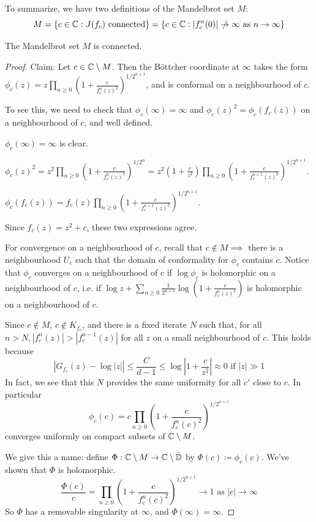 \documentclass[10pt,a4paper]{article}
\begin{document}
To summarize, we have two definitions of the Mandelbrot set $M$:
\[M = \{c \in \C : J(f_c) \text{ connected}\} = \{c \in \C: |f_c^n(0)|\centernot\to \infty \text{ as }n\to\infty\}\]
\begin{theorem}
  The Mandelbrot set $M$ is connected.
\end{theorem}
\begin{proof}
  Claim: Let $c \in \mathbb{C}\setminus M$. Then the B\"ottcher coordinate at $\infty$ takes the form $\phi_c(z) = z\prod_{n\geq 0}\left(1+\frac{c}{f_c^n(z)^2}\right)^{1/2^{n+1}}$, and is conformal on a neighbourhood of $c$.

  To see this, we need to check that $\phi_c(\infty) = \infty$ and $\phi_c(z)^2 = \phi_c(f_c(z))$ on a neighbourhood of $c$, and well defined.

  $\phi_c(\infty) = \infty$ is clear.

  $\phi_c(z)^2 = z^2\prod_{n\geq 0}\left(1+\frac{c}{f_c^n(z)^2}\right)^{1/2^n} = z^2\left(1+\frac{c}{z^2}\right)\prod_{n\geq 0}\left(1+\frac{c}{f_c^{n+1}(z)^2}\right)^{1/2^{n+1}}$.

  $\phi_c(f_c(z)) = f_c(z)\prod_{n\geq 0}\left(1+\frac{c}{f_c^{n+1}(z)^2}\right)^{1/2^{n+1}}$.

  Since $f_c(z) = z^2+c$, these two expressions agree.

  For convergence on a neighbourhood of $c$, recall that $c \notin M \implies$ there is a neighbourhood $U_c$ such that the domain of conformality for $\phi_c$ contains $c$. Notice that $\phi_c$ converges on a neighbourhood of $c$ if $\log \phi_c$ is holomorphic on a neighbourhood of $c$, i.e. if $\log z +\sum_{n\geq 0}\frac{1}{2^{n+1}}\log\left(1+\frac{c}{f_c^n(z)^2}\right)$ is holomorphic on a neighbourhood of $c$.

  Since $c \notin M$, $c \notin K_{f_c}$, and there is a fixed iterate $N$ such that, for all $n > N, |f_c^n(z)| > |f_c^{n-1}(z)|$ for all $z$ on a small neighbourhood of $c$. This holds because
  \[\left|G_{f_c}(z) - \log|z|\right| \leq \frac{C}{d-1} \leq \log\left|1+\frac{c}{z^2}\right| \approx 0 \text{ if } |z| \gg 1\]
  In fact, we see that this $N$ provides the same uniformity for all $c'$ close to $c$. In particular
  \[\phi_c(c) = c\prod_{n\geq 0}\left(1+\frac{c}{f_c^n(c)^2}\right)^{1/2^{n+1}}\]
  converges uniformly on compact subsets of $\mathbb{C}\setminus M$.

  We give this a name: define $\Phi:\mathbb{C}\setminus M \to \mathbb{C}\setminus\bar{\mathbb{D}}$ by $\Phi(c) \coloneqq \phi_c(c)$. We've shown that $\Phi$ is holomorphic.
  \[\frac{\Phi(c)}{c} = \prod_{n\geq 0}\left(1+\frac{c}{f_c^n(c)^2}\right)^{1/2^{n+1}} \to 1 \text{ as } |c|\to\infty\]
  So $\Phi$ has a removable singularity at $\infty$, and $\Phi(\infty)= \infty$.


\end{proof}
\end{document}
